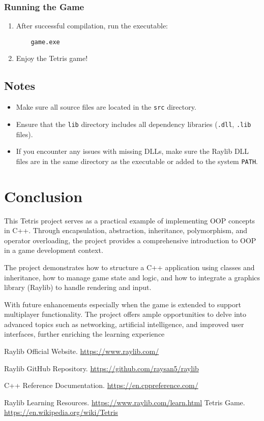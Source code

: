 \documentclass{article}
\begin{document}
\subsubsection{Running the Game}

\begin{enumerate}
    \item After successful compilation, run the executable:
    \begin{lstlisting}
    game.exe
    \end{lstlisting}
    \item Enjoy the Tetris game!
\end{enumerate}

\subsection{Notes}

\begin{itemize}
    \item Make sure all source files are located in the \texttt{src} directory.
    \item Ensure that the \texttt{lib} directory includes all dependency libraries (\texttt{.dll}, \texttt{.lib} files).
    \item If you encounter any issues with missing DLLs, make sure the Raylib DLL files are in the same directory as the executable or added to the system \texttt{PATH}.
\end{itemize}

\section{Conclusion}

This Tetris project serves as a practical example of implementing OOP concepts in C++. Through encapsulation, abstraction, inheritance, polymorphism, and operator overloading, the project provides a comprehensive introduction to OOP in a game development context.

The project demonstrates how to structure a C++ application using classes and inheritance, how to manage game state and logic, and how to integrate a graphics library (Raylib) to handle rendering and input.

With future enhancements especially when the game is extended to support multiplayer functionality. The project offers ample opportunities to delve into advanced topics such as networking, artificial intelligence, and improved user interfaces, further enriching the learning experience
\newpage
\begin{thebibliography}{9}

Raylib Official Website. \url{https://www.raylib.com/}

Raylib GitHub Repository. \url{https://github.com/raysan5/raylib}

C++ Reference Documentation. \url{https://en.cppreference.com/}

Raylib Learning Resources. \url{https://www.raylib.com/learn.html}
Tetris Game. \url{https://en.wikipedia.org/wiki/Tetris}
\end{thebibliography}
\end{document}
